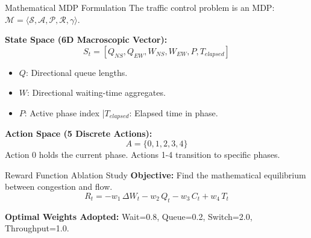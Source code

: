 \documentclass[aspectratio=169]{beamer}
\begin{document}
\begin{frame}{Mathematical MDP Formulation}
  The traffic control problem is an MDP: $\mathcal{M}=\langle \mathcal{S},\mathcal{A},\mathcal{P},\mathcal{R},\gamma \rangle$.

  \vspace{0.5cm}
  \textbf{State Space (6D Macroscopic Vector):}
  \[ S_t = [Q_{NS}, Q_{EW}, W_{NS}, W_{EW}, P, T_{elapsed}] \]
  \begin{itemize}
      \item \textcolor{ElectricMint}{$Q$}: Directional queue lengths.
      \item \textcolor{ElectricMint}{$W$}: Directional waiting-time aggregates.
      \item \textcolor{ElectricMint}{$P$}: Active phase index \quad|\quad \textcolor{ElectricMint}{$T_{elapsed}$}: Elapsed time in phase.
  \end{itemize}

  \vspace{0.5cm}
  \textbf{Action Space (5 Discrete Actions):}
  \[ A = \{0, 1, 2, 3, 4\} \]
  {\small Action 0 holds the current phase. Actions 1-4 transition to specific phases.}
\end{frame}

\begin{frame}{Reward Function Ablation Study}
  \textbf{Objective:} Find the mathematical equilibrium between congestion and flow.
  \[ R_t = -w_1\,\Delta W_t - w_2\,Q_t - w_3\,C_t + w_4\,T_t \]
  
  \vspace{0.2cm}
  \begin{table}
  \centering
  \renewcommand{\arraystretch}{1.2}
  \end{table}

  \vspace{0.2cm}
  \small \textbf{Optimal Weights Adopted:} Wait=0.8, Queue=0.2, Switch=2.0, Throughput=1.0.
\end{frame}
\end{document}
